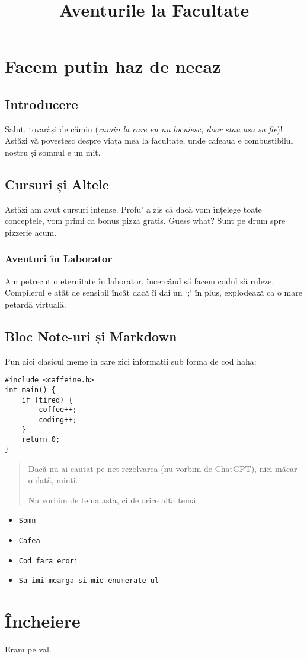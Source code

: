 \title{Aventurile la Facultate}


\section{Facem putin haz de necaz}

\subsection{Introducere}
Salut, tovarăși de cămin (\textit{camin la care eu nu locuiesc, doar stau asa sa fie})! Astăzi vă povestesc despre viața mea la facultate, unde cafeaua e combustibilul nostru și somnul e un mit.

\subsection{Cursuri și Altele}
Astăzi am avut cursuri intense. Profu' a zis că dacă vom înțelege toate conceptele, vom primi ca bonus pizza gratis. Guess what? Sunt pe drum spre pizzerie acum.

\subsubsection{Aventuri în Laborator}
Am petrecut o eternitate în laborator, încercând să facem codul să ruleze. Compilerul e atât de sensibil încât dacă îi dai un `;` în plus, explodează ca o mare petardă virtuală.

\subsection{Bloc Note-uri și Markdown}
Pun aici clasicul meme in care zici informatii sub forma de cod haha:

\begin{verbatim}
#include <caffeine.h>
int main() {
    if (tired) {
        coffee++;
        coding++;
    }
    return 0;
}
\end{verbatim}

\begin{quotation}
Dacă nu ai cautat pe net rezolvarea (nu vorbim de ChatGPT), nici măcar o dată, minti.

Nu vorbim de tema asta, ci de orice altă temă.
\end{quotation}

\begin{itemize}
    \item \texttt{Somn}
    \item \texttt{Cafea}
    \item \texttt{Cod fara erori}
    \item \texttt{Sa imi mearga si mie enumerate-ul}
\end{itemize}

\section{Încheiere}
Eram pe val.


